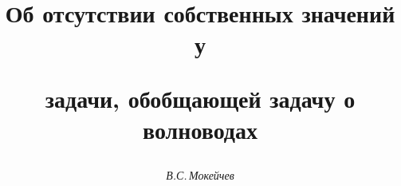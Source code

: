 









\newcommand{\loc}{\operatorname{loc}}


\newcommand{\tts}[1]{}







\setcounter{page}{41}















\author{\it В.С.\,Мокейчев}




\title{Об отсутствии  собственных значений у


задачи, обобщающей задачу о волноводах}





\date{}




\pagestyle{plain} %







\maketitle


\label{begin}











